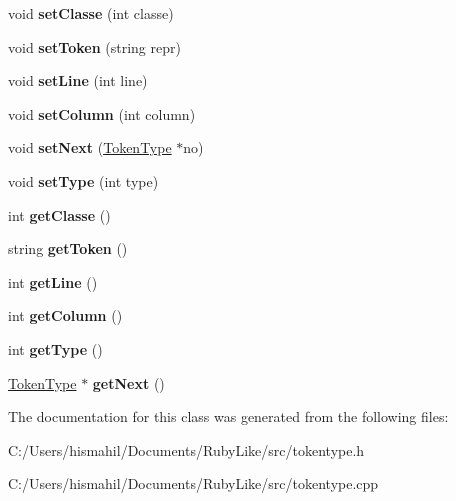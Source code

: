 \begin{DoxyCompactItemize}
\item 
\hypertarget{class_token_type_a3b011053a11e2d82f58d2046702a1257}{void {\bfseries set\-Classe} (int classe)}\label{class_token_type_a3b011053a11e2d82f58d2046702a1257}

\item 
\hypertarget{class_token_type_ac7ecfb01f9d72e23d6dc3d6a8f081a80}{void {\bfseries set\-Token} (string repr)}\label{class_token_type_ac7ecfb01f9d72e23d6dc3d6a8f081a80}

\item 
\hypertarget{class_token_type_a93e22d1c0424d1edf8f6ee8e66d7ff31}{void {\bfseries set\-Line} (int line)}\label{class_token_type_a93e22d1c0424d1edf8f6ee8e66d7ff31}

\item 
\hypertarget{class_token_type_a1b19294195be56652d1d37f736462277}{void {\bfseries set\-Column} (int column)}\label{class_token_type_a1b19294195be56652d1d37f736462277}

\item 
\hypertarget{class_token_type_a143e63aff1ffc82e11f42eb23e5bd448}{void {\bfseries set\-Next} (\hyperlink{class_token_type}{Token\-Type} $\ast$no)}\label{class_token_type_a143e63aff1ffc82e11f42eb23e5bd448}

\item 
\hypertarget{class_token_type_a371ad064991e873616d98fb7a388f00a}{void {\bfseries set\-Type} (int type)}\label{class_token_type_a371ad064991e873616d98fb7a388f00a}

\item 
\hypertarget{class_token_type_ac64dbb3f1f493c598bd629631f6e3274}{int {\bfseries get\-Classe} ()}\label{class_token_type_ac64dbb3f1f493c598bd629631f6e3274}

\item 
\hypertarget{class_token_type_a8a899b8b6f05074c8330ec54849ff3f8}{string {\bfseries get\-Token} ()}\label{class_token_type_a8a899b8b6f05074c8330ec54849ff3f8}

\item 
\hypertarget{class_token_type_aee7a165d0de8d9f58a16f96e987705f4}{int {\bfseries get\-Line} ()}\label{class_token_type_aee7a165d0de8d9f58a16f96e987705f4}

\item 
\hypertarget{class_token_type_a34ab252ea0332496b0605acb6cab450f}{int {\bfseries get\-Column} ()}\label{class_token_type_a34ab252ea0332496b0605acb6cab450f}

\item 
\hypertarget{class_token_type_a38ce58f3163b029f4788ca1ad025fc04}{int {\bfseries get\-Type} ()}\label{class_token_type_a38ce58f3163b029f4788ca1ad025fc04}

\item 
\hypertarget{class_token_type_ad3ebcefc31023426c1e13d08d348bf34}{\hyperlink{class_token_type}{Token\-Type} $\ast$ {\bfseries get\-Next} ()}\label{class_token_type_ad3ebcefc31023426c1e13d08d348bf34}

\end{DoxyCompactItemize}


The documentation for this class was generated from the following files\-:\begin{DoxyCompactItemize}
\item 
C\-:/\-Users/hismahil/\-Documents/\-Ruby\-Like/src/tokentype.\-h\item 
C\-:/\-Users/hismahil/\-Documents/\-Ruby\-Like/src/tokentype.\-cpp\end{DoxyCompactItemize}

